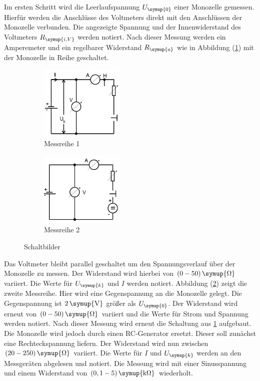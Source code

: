 Im ersten Schritt wird die Leerlaufspannung $U_\symup{0}$ einer Monozelle
gemessen. Hierfür werden die Anschlüsse des Voltmeters direkt mit den Anschlüssen
der Monozelle verbunden. Die angezeigte Spannung und der Innenwiderstand des
Voltmeters $R_\symup{i,V}$ werden notiert.
Nach dieser Messung werden ein Amperemeter und ein regelbarer Widerstand
$R_\symup{a}$ wie in Abbildung (\ref{fig:schlt1}) mit der Monozelle in Reihe geschaltet.
\begin{figure}[H]
  \centering
  \begin{subfigure}{0.48\textwidth}
    \centering
    \includegraphics[width=4cm]{bilder/sinrecht.jpg}
    \caption{Messreihe 1}
    \label{fig:schlt1}
  \end{subfigure}
  \begin{subfigure}{0.48\textwidth}
    \centering
    \includegraphics[width=4cm]{bilder/gegenspannung.jpg}
    \caption{Messreihe 2}
    \label{fig:schlt2}
  \end{subfigure}
  \caption{Schaltbilder \cite{301}}
  \label{fig:schlt}
\end{figure}
Das Voltmeter bleibt parallel geschaltet um den Spannungsverlauf über der
Monozelle zu messen. Der Widerstand wird hierbei von $(0-50)\,\symup{\si{\ohm}}$
variiert. Die Werte für $U_\symup{k}$ und $I$ werden notiert.
Abbildung (\ref{fig:schlt2}) zeigt die zweite Messreihe. Hier wird eine
Gegenspannung an die Monozelle gelegt. Die Gegenspannung ist $2\,\symup{\si{\volt}}$
größer als $U_\symup{0}$. Der Widerstand wird erneut von $(0-50)\,\symup{\si{\ohm}}$
variiert und die Werte für Strom und Spannung werden notiert.
Nach dieser Messung wird erneut die Schaltung aus \ref{fig:schlt1} aufgebaut.
Die Monozelle wird jedoch durch einen RC-Generator ersetzt. Dieser soll zunächst
eine Rechteckspannung liefern. Der Widerstand wird nun zwischen $(20-250)\,\symup{\si{\ohm}}$
variiert. Die Werte für $I$ und $U_\symup{k}$ werden an den Messgeräten
abgelesen und notiert.
Die Messung wird mit einer Sinusspannung und einem Widerstand von
$(0,1-5)\,\symup{\si{\kilo\ohm}}$ wiederholt.
